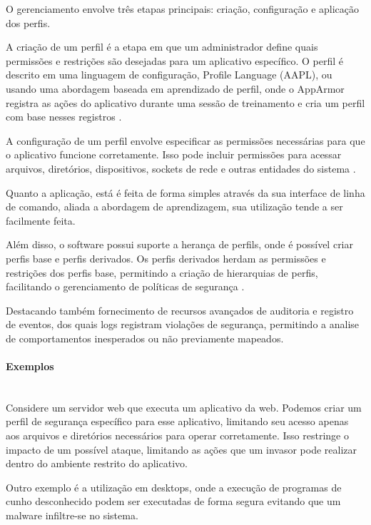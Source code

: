 O gerenciamento envolve três etapas principais: criação, configuração e aplicação dos perfis.

A criação de um perfil é a etapa em que um administrador define quais permissões e restrições são desejadas para um aplicativo específico. O perfil é descrito em uma linguagem de configuração, Profile Language (AAPL), ou usando uma abordagem baseada em aprendizado de perfil, onde o AppArmor registra as ações do aplicativo durante uma sessão de treinamento e cria um perfil com base nesses registros \cite{apparmor-gitlab}.

A configuração de um perfil envolve especificar as permissões necessárias para que o aplicativo funcione corretamente. Isso pode incluir permissões para acessar arquivos, diretórios, dispositivos, sockets de rede e outras entidades do sistema \cite{apparmor-security-and-integration}.

Quanto a aplicação, está é feita de forma simples através da sua interface de linha de comando, aliada a abordagem de aprendizagem, sua utilização tende a ser facilmente feita.

Além disso, o software possui suporte a herança de perfils, onde é possível criar perfis base e perfis derivados. Os perfis derivados herdam as permissões e restrições dos perfis base, permitindo a criação de hierarquias de perfis, facilitando o gerenciamento de políticas de segurança \cite{debian-handbook}.

Destacando também fornecimento de recursos avançados de auditoria e registro de eventos, dos quais logs registram violações de segurança, permitindo a analise de comportamentos inesperados ou não previamente mapeados.

\paragraph*{Exemplos}\mbox{}\\
 Considere um servidor web que executa um aplicativo da web. Podemos criar um perfil de segurança específico para esse aplicativo, limitando seu acesso apenas aos arquivos e diretórios necessários para operar corretamente. Isso restringe o impacto de um possível ataque, limitando as ações que um invasor pode realizar dentro do ambiente restrito do aplicativo.

Outro exemplo é a utilização em desktops, onde a execução de programas de cunho desconhecido podem ser executadas de forma segura evitando que um malware infiltre-se no sistema.
